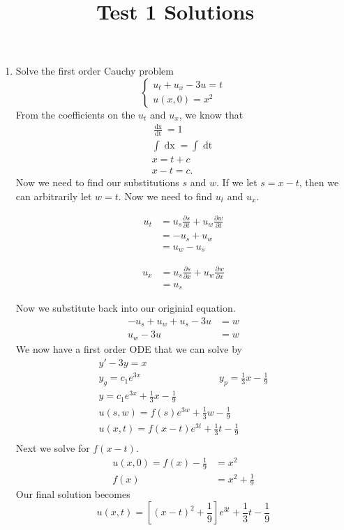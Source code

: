 \documentclass{article}
\title{Test 1 Solutions}
\date{}
\newcommand{\ut}{u_{t}}
\newcommand{\ux}{u_{x}}
\newcommand{\dx}{\mathop{dx}}
\newcommand{\dt}{\mathop{dt}}
\newcommand{\pt}{\partial}
\begin{document}
\begin{enumerate}
\item Solve the first order Cauchy problem
\[
\begin{cases}
\ut + \ux - 3u = t\\
u(x,0) = x^{2}
\end{cases}
\]
From the coefficients on the $\ut$ and $\ux$, we know that
\begin{gather*}
\frac{\dx}{\dt} = 1\\
\int \dx = \int \dt\\
x = t + c\\
x- t = c.
\end{gather*}
Now we need to find our substitutions $s$ and $w$.
If we let $s = x-t$, then we can arbitrarily let $w = t$.
Now we need to find $\ut$ and $\ux$.

\begin{minipage}[t]{0.5\textwidth}
\begin{align*}
\ut &= u_{s}\frac{\pt s}{\pt t} + u_{w}\frac{\pt w}{\pt t}\\
&= -u_{s} + u_{w}\\
&= u_{w} - u_{s}
\end{align*}
\end{minipage}
\begin{minipage}[t]{0.5\textwidth}
\begin{align*}
\ux &= u_{s}\frac{\pt s}{\pt x} + u_{w}\frac{\pt w}{\pt x}\\
&= u_{s}
\end{align*}
\end{minipage}
Now we substitute back into our originial equation.
\begin{align*}
-u_{s} + u_{w} + u_{s} - 3u &= w\\
u_{w} - 3u &= w
\end{align*}
We now have a first order ODE that we can solve by
\begin{gather*}
y' - 3y = x\\
y_{g} = c_{1}e^{3x} \qquad\qquad\qquad\qquad y_{p} = \frac{1}{3}x - \frac{1}{9}\\
y = c_{1}e^{3x} + \frac{1}{3}x - \frac{1}{9}\\
u(s,w) = f(s)e^{3w} + \frac{1}{3}w - \frac{1}{9}\\
u(x,t) = f(x-t)e^{3t} + \frac{1}{3}t - \frac{1}{9}\\
\end{gather*}
Next we solve for $f(x-t)$.
\begin{align*}
u(x,0) = f(x) - \frac{1}{9} &= x^{2}\\
f(x) &= x^{2} + \frac{1}{9}
\end{align*}
Our final solution becomes
\[
u(x,t) = \left[(x-t)^{2} + \frac{1}{9}\right]e^{3t}+\frac{1}{3}t - \frac{1}{9}
\]
\newpage


\end{enumerate}
\end{document}
